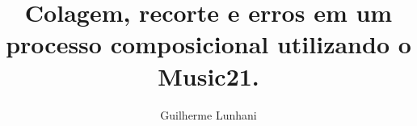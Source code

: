 \title{Colagem, recorte e erros em um processo composicional utilizando o Music21.}

\author{Guilherme Lunhani}

\address{Instituto de Artes e Design --
         Universidade Federal de Juiz de Fora \\
         Juiz de Fora, MG
}
